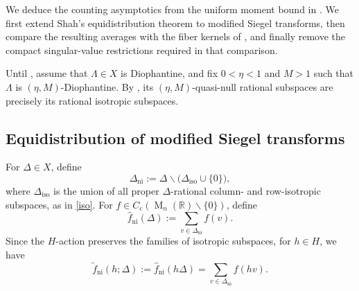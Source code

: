 \documentclass[reqno,11pt]{amsart}
\numberwithin{equation}{section}
\theoremstyle{definition}
\theoremstyle{remark}
\newcommand{\op}{\operatorname}
\newcommand{\R}{\mathbb R}
\newcommand{\M}{\op{M}}
\begin{document}
We deduce the counting asymptotics from the uniform moment bound in
. We first extend Shah's
equidistribution theorem to modified Siegel transforms, then compare the
resulting averages with the fiber kernels of , and
finally remove the compact singular-value restrictions required in that
comparison.

Until , assume that $\Lambda\in X$ is Diophantine,
and fix
$0<\eta<1$ and $M>1$ such that $\Lambda$ is
$(\eta,M)$-Diophantine. By , its
$(\eta,M)$-quasi-null rational subspaces are precisely its rational
isotropic subspaces.

\subsection{Equidistribution of modified Siegel transforms}

For $\Delta\in X$, define
\begin{equation}\label{ni}
\Delta_{\operatorname{ni}}
:=
\Delta\smallsetminus
\bigl(\Delta_{\operatorname{iso}}\cup\{0\}\bigr),
\end{equation}
where $\Delta_{\operatorname{iso}}$ is the union of all proper
$\Delta$-rational column- and row-isotropic subspaces, as in \eqref{iso}.
For $f\in C_c(\M_n(\R)\smallsetminus\{0\})$, define
$$
\widehat f_{\operatorname{ni}}(\Delta)
:=
\sum_{v\in\Delta_{\operatorname{ni}}}f(v).
$$
Since the $H$-action preserves the families of isotropic subspaces, for $h\in H$, we
have
$$
\widetilde f_{\operatorname{ni}}(h;\Delta)
:=
\widehat f_{\operatorname{ni}}(h\Delta)
=
\sum_{v\in\Delta_{\operatorname{ni}}}f(hv).
$$
\end{document}
